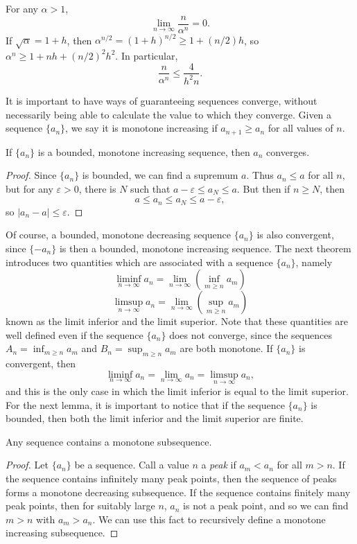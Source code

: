 \begin{example}
    For any $\alpha > 1$,
    \[ \lim_{n \to \infty} \frac{n}{\alpha^n} = 0. \]
    If $\sqrt{\alpha} = 1 + h$, then $\alpha^{n/2} = (1 + h)^{n/2} \geq 1 + (n/2)h$, so $\alpha^n \geq 1 + nh + (n/2)^2h^2$. In particular,
    \[ \frac{n}{\alpha^n} \leq \frac{4}{h^2n}. \]
\end{example}

It is important to have ways of guaranteeing sequences converge, without necessarily being able to calculate the value to which they converge. Given a sequence $\{ a_n \}$, we say it is monotone increasing if $a_{n+1} \geq a_n$ for all values of $n$.

\begin{theorem}
    If $\{ a_n \}$ is a bounded, monotone increasing sequence, then $a_n$ converges.
\end{theorem}
\begin{proof}
    Since $\{ a_n \}$ is bounded, we can find a supremum $a$. Thus $a_n \leq a$ for all $n$, but for any $\varepsilon > 0$, there is $N$ such that $a - \varepsilon \leq a_N \leq a$. But then if $n \geq N$, then
    \[ a \leq a_n \leq a_N \leq a - \varepsilon, \]
    so $|a_n - a| \leq \varepsilon$.
\end{proof}

Of course, a bounded, monotone decreasing sequence $\{ a_n \}$ is also convergent, since $\{ -a_n \}$ is then a bounded, monotone increasing sequence. The next theorem introduces two quantities which are associated with a sequence $\{ a_n \}$, namely
%
\[ \liminf_{n \to \infty} a_n = \lim_{n \to \infty} \left( \inf_{m \geq n} a_m \right) \]
\[ \limsup_{n \to \infty} a_n = \lim_{n \to \infty} \left( \sup_{m \geq n} a_m \right) \]
%
known as the limit inferior and the limit superior. Note that these quantities are well defined even if the sequence $\{ a_n \}$ does not converge, since the sequences $A_n = \inf_{m \geq n} a_m$ and $B_n = \sup_{m \geq n} a_m$ are both monotone. If $\{ a_n \}$ is convergent, then
%
\[ \liminf_{n \to \infty} a_n = \lim_{n \to \infty} a_n = \limsup_{n \to \infty} a_n, \]
%
and this is the only case in which the limit inferior is equal to the limit superior. For the next lemma, it is important to notice that if the sequence $\{ a_n \}$ is bounded, then both the limit inferior and the limit superior are finite.

\begin{lemma}
    Any sequence contains a monotone subsequence.
\end{lemma}
\begin{proof}
    Let $\{ a_n \}$ be a sequence. Call a value $n$ a \emph{peak} if $a_m < a_n$ for all $m > n$. If the sequence contains infinitely many peak points, then the sequence of peaks forms a monotone decreasing subsequence. If the sequence contains finitely many peak points, then for suitably large $n$, $a_n$ is not a peak point, and so we can find $m > n$ with $a_m > a_n$. We can use this fact to recursively define a monotone increasing subsequence.
\end{proof}

